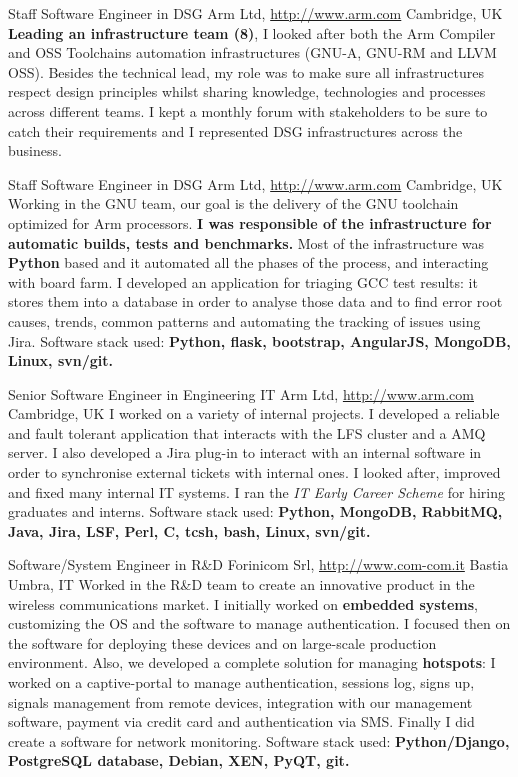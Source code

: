 \documentclass[10pt,a4paper,sans]{moderncv}
\begin{document}
    {Staff Software Engineer in DSG}
    {Arm Ltd, \url{http://www.arm.com}}
    {Cambridge, UK}{}
    {\textbf{Leading an infrastructure team (8)}, I looked after both the Arm
    Compiler and OSS Toolchains automation infrastructures (GNU-A, GNU-RM and
    LLVM OSS). Besides the technical lead, my role was to make sure all
    infrastructures respect design principles whilst sharing knowledge,
    technologies and processes across different teams. I kept a monthly forum
    with stakeholders to be sure to catch their requirements and I represented
    DSG infrastructures across the business.}

    {Staff Software Engineer in DSG}
    {Arm Ltd, \url{http://www.arm.com}}
    {Cambridge, UK}{}
    {Working in the GNU team, our goal is the delivery of the GNU toolchain
    optimized for Arm processors. \textbf{I was responsible of the
    infrastructure for automatic builds, tests and benchmarks.} Most of the
    infrastructure was \textbf{Python} based and it automated all the phases of
    the process, and interacting with board farm.
    I developed an application for triaging GCC test results: it stores them
    into a database in order to analyse those data and to find error root
    causes, trends, common patterns and automating the tracking of issues using
    Jira.
    Software stack used: \textbf{Python, flask, bootstrap, AngularJS,
    MongoDB, Linux, svn/git.}}

    {Senior Software Engineer in Engineering IT}
    {Arm Ltd, \url{http://www.arm.com}}
    {Cambridge, UK}{}
    {I worked on a variety of internal projects. I developed a reliable and
    fault tolerant application that interacts with the LFS cluster and a AMQ
    server.
    I also developed a Jira plug-in to interact with an internal software in
    order to synchronise external tickets with internal ones.
    I looked after, improved and fixed many internal IT systems.
    I ran the \textit{IT Early Career Scheme} for hiring graduates and interns.
    Software stack used: \textbf{Python, MongoDB, RabbitMQ, Java, Jira, LSF,
    Perl, C, tcsh, bash, Linux, svn/git.}}

    {Software/System Engineer in R\&D}
    {Forinicom Srl, \url{http://www.com-com.it}}
    {Bastia Umbra, IT}{}
    {Worked in the R\&D team to create an innovative product in the wireless
    communications market. I initially worked on \textbf{embedded systems},
    customizing the OS and the software to manage authentication. I focused
    then on the software for deploying these devices and on large-scale
    production environment. Also, we developed a complete solution for managing
    \textbf{hotspots}: I worked on a captive-portal to manage authentication,
    sessions log, signs up, signals management from remote devices, integration
    with our management software, payment via credit card and authentication
    via SMS\@. Finally I did create a software for network monitoring.
    Software stack used: \textbf{Python/Django, PostgreSQL database, Debian,
    XEN, PyQT, git.}}
\end{document}
